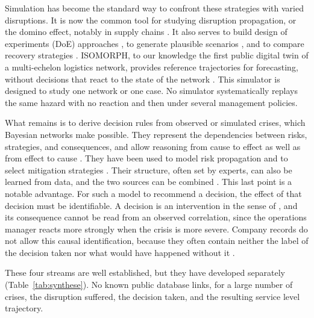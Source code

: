 Simulation has become the standard way to confront these strategies with varied disruptions. It is now the common tool for studying disruption propagation, or the domino effect, notably in supply chains \citep{schmitt2012, ivanov2017}. It also serves to build design of experiments (DoE) approaches \citep{macdonald2018}, to generate plausible scenarios \citep{klibi2012ejor}, and to compare recovery strategies \citep{ramzy2022}. ISOMORPH, to our knowledge the first public digital twin of a multi-echelon logistics network, provides reference trajectories for forecasting, without decisions that react to the state of the network \citep{zhang2026isomorph}. This simulator is designed to study one network or one case. No simulator systematically replays the same hazard with no reaction and then under several management policies.

What remains is to derive decision rules from observed or simulated crises, which Bayesian networks make possible. They represent the dependencies between risks, strategies, and consequences, and allow reasoning from cause to effect as well as from effect to cause \citep{hosseiniivanov2020}. They have been used to model risk propagation \citep{garvey2015, ojha2018} and to select mitigation strategies \citep{qazi2018}. Their structure, often set by experts, can also be learned from data, and the two sources can be combined \citep{heckerman1995}. This last point is a notable advantage. For such a model to recommend a decision, the effect of that decision must be identifiable. A decision is an intervention in the sense of \citet{pearl2009}, and its consequence cannot be read from an observed correlation, since the operations manager reacts more strongly when the crisis is more severe. Company records do not allow this causal identification, because they often contain neither the label of the decision taken nor what would have happened without it \citep{do2024}.

These four streams are well established, but they have developed separately (Table~\ref{tab:synthese}). No known public database links, for a large number of crises, the disruption suffered, the decision taken, and the resulting service level trajectory.


